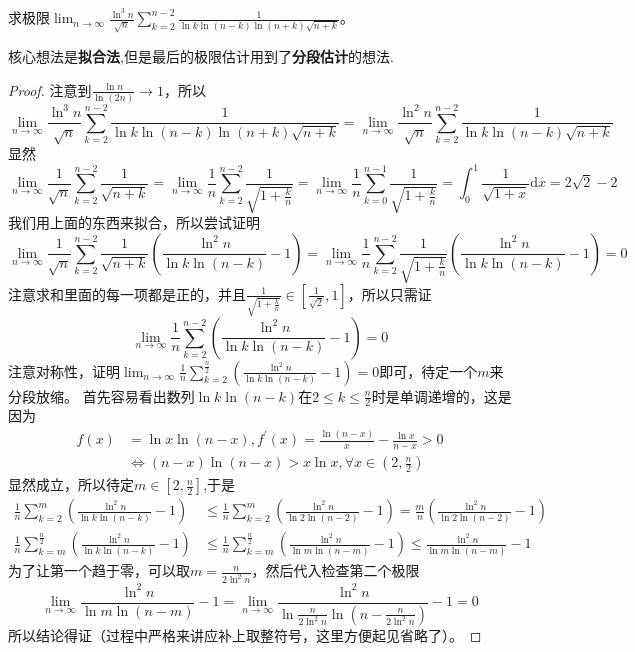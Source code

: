 \documentclass[../../main.tex]{subfiles}
\begin{document}
\begin{example}
求极限\(\lim_{n\rightarrow\infty}\frac{\ln^3n}{\sqrt{n}}\sum_{k = 2}^{n - 2}\frac{1}{\ln k\ln(n - k)\ln(n + k)\sqrt{n + k}}\)。
\end{example}
\begin{note}
核心想法是\textbf{拟合法},但是最后的极限估计用到了\textbf{分段估计}的想法.
\end{note}
\begin{proof}
注意到\(\frac{\ln n}{\ln(2n)}\to1\)，所以
\[
\lim_{n\rightarrow\infty}\frac{\ln^3n}{\sqrt{n}}\sum_{k = 2}^{n - 2}\frac{1}{\ln k\ln(n - k)\ln(n + k)\sqrt{n + k}}=\lim_{n\rightarrow\infty}\frac{\ln^2n}{\sqrt{n}}\sum_{k = 2}^{n - 2}\frac{1}{\ln k\ln(n - k)\sqrt{n + k}}
\]
显然
\[
\lim_{n\rightarrow\infty}\frac{1}{\sqrt{n}}\sum_{k = 2}^{n - 2}\frac{1}{\sqrt{n + k}}=\lim_{n\rightarrow\infty}\frac{1}{n}\sum_{k = 2}^{n - 2}\frac{1}{\sqrt{1+\frac{k}{n}}}=\lim_{n\rightarrow\infty}\frac{1}{n}\sum_{k = 0}^{n - 1}\frac{1}{\sqrt{1+\frac{k}{n}}}=\int_{0}^{1}\frac{1}{\sqrt{1 + x}}\mathrm{d}x=2\sqrt{2}-2
\]
我们用上面的东西来拟合，所以尝试证明
\[
\lim_{n\rightarrow\infty}\frac{1}{\sqrt{n}}\sum_{k = 2}^{n - 2}\frac{1}{\sqrt{n + k}}\left(\frac{\ln^2n}{\ln k\ln(n - k)}-1\right)=\lim_{n\rightarrow\infty}\frac{1}{n}\sum_{k = 2}^{n - 2}\frac{1}{\sqrt{1+\frac{k}{n}}}\left(\frac{\ln^2n}{\ln k\ln(n - k)}-1\right)=0
\]
注意求和里面的每一项都是正的，并且\(\frac{1}{\sqrt{1+\frac{k}{n}}}\in\left[\frac{1}{\sqrt{2}},1\right]\)，所以只需证
\[
\lim_{n\rightarrow\infty}\frac{1}{n}\sum_{k = 2}^{n - 2}\left(\frac{\ln^2n}{\ln k\ln(n - k)}-1\right)=0
\]
注意对称性，证明\(\lim_{n\rightarrow\infty}\frac{1}{n}\sum_{k = 2}^{\frac{n}{2}}\left(\frac{\ln^2n}{\ln k\ln(n - k)}-1\right)=0\)即可，待定一个\(m\)来分段放缩。
首先容易看出数列\(\ln k\ln(n - k)\)在\(2\leqslant  k\leqslant \frac{n}{2}\)时是单调递增的，这是因为
\begin{align*}
f(x)&=\ln x\ln(n - x),f^\prime(x)=\frac{\ln(n - x)}{x}-\frac{\ln x}{n - x}>0\\
&\Leftrightarrow(n - x)\ln(n - x)>x\ln x,\forall x\in\left(2,\frac{n}{2}\right)
\end{align*}
显然成立，所以待定$m\in[2,\frac{n}{2}]$,于是
\begin{align*}
\frac{1}{n}\sum_{k = 2}^{m}\left(\frac{\ln^2n}{\ln k\ln(n - k)}-1\right)&\leqslant \frac{1}{n}\sum_{k = 2}^{m}\left(\frac{\ln^2n}{\ln 2\ln(n - 2)}-1\right)=\frac{m}{n}\left(\frac{\ln^2n}{\ln 2\ln(n - 2)}-1\right)\\
\frac{1}{n}\sum_{k = m}^{\frac{n}{2}}\left(\frac{\ln^2n}{\ln k\ln(n - k)}-1\right)&\leqslant \frac{1}{n}\sum_{k = m}^{\frac{n}{2}}\left(\frac{\ln^2n}{\ln m\ln(n - m)}-1\right)\leqslant \frac{\ln^2n}{\ln m\ln(n - m)}-1
\end{align*}
为了让第一个趋于零，可以取\(m = \frac{n}{2\ln^2n}\)，然后代入检查第二个极限
\[
\lim_{n\rightarrow\infty}\frac{\ln^2n}{\ln m\ln(n - m)}-1=\lim_{n\rightarrow\infty}\frac{\ln^2n}{\ln\frac{n}{2\ln^2n}\ln\left(n-\frac{n}{2\ln^2n}\right)}-1 = 0
\]
所以结论得证（过程中严格来讲应补上取整符号，这里方便起见省略了）。
\end{proof}
\end{document}

